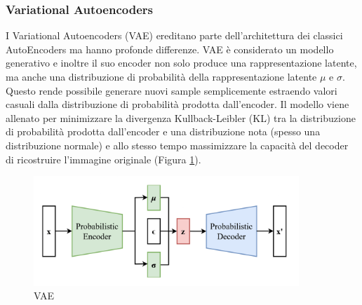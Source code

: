 \subsubsection{Variational Autoencoders}
I Variational Autoencoders (VAE) ereditano parte dell'architettura dei classici AutoEncoders ma hanno profonde differenze. VAE è considerato un modello generativo e inoltre il suo encoder non solo produce una rappresentazione latente, ma anche una distribuzione di probabilità della rappresentazione latente $\mu$ e $\sigma$. Questo rende possibile generare nuovi sample semplicemente estraendo valori casuali dalla distribuzione di probabilità prodotta dall'encoder.
Il modello viene allenato per minimizzare la divergenza Kullback-Leibler (KL) tra la distribuzione di probabilità prodotta dall'encoder e una distribuzione nota (spesso una distribuzione normale) e allo stesso tempo massimizzare la capacità del decoder di ricostruire l'immagine originale (Figura \ref{vae}).
\begin{figure}[t]
	\centering
	\includegraphics[width=10cm, scale=1]{images/vae}
	\caption{VAE}
	\label{vae}
\end{figure}

